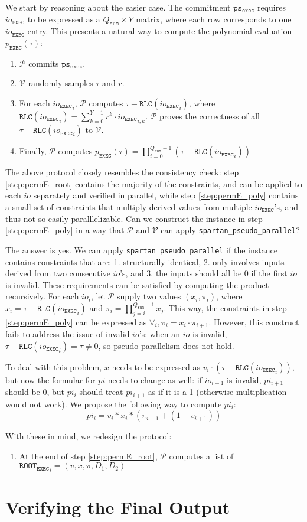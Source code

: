 \documentclass{article}
\newcommand{\code}{\texttt}
\newcommand{\Qsum}{Q_{\mathtt{sum}}}
\renewcommand{\P}{\mathcal{P}}
\newcommand{\V}{\mathcal{V}}
\newcommand{\RLC}{\mathtt{RLC}}
\newcommand{\ioe}{io_{\mathtt{EXEC}}}
\newcommand{\ROOTE}{\mathtt{ROOT_{EXEC}}}
\newcommand{\pse}{\mathtt{ps_{exec}}}
\begin{document}
We start by reasoning about the easier case. The commitment $\pse$ requires $\ioe$ to be expressed as a $\Qsum\times Y$ matrix, where each row corresponds to one $\ioe$ entry. This presents a natural way to compute the polynomial evaluation $p_\mathtt{EXEC}(\tau)$:
\begin{enumerate}
    \item $\P$ commits $\pse$.
    \item $\V$ randomly samples $\tau$ and $r$.
    \item \label{step:permE_root} For each ${\ioe}_i$, $\P$ computes $\tau - \RLC({\ioe}_i)$, where $\RLC({\ioe}_i) = \sum_{k = 0}^{Y-1} r^k \cdot {\ioe}_{i, k}$. $\P$ proves the correctness of all $\tau - \RLC({\ioe}_i)$ to $\V$.
    \item \label{step:permE_poly} Finally, $\P$ computes $p_\mathtt{EXEC}(\tau) = \prod_{i = 0}^{\Qsum - 1}(\tau - \RLC({\ioe}_i))$
\end{enumerate}

The above protocol closely resembles the consistency check: step \ref{step:permE_root} contains the majority of the constraints, and can be applied to each $io$ separately and verified in parallel, while step \ref{step:permE_poly} contains a small set of constraints that multiply derived values from multiple $\ioe$'s, and thus not so easily paralllelizable. Can we construct the instance in step \ref{step:permE_poly} in a way that $\P$ and $\V$ can apply \code{spartan\_pseudo\_parallel}?

The answer is yes. We can apply \code{spartan\_pseudo\_parallel} if the instance contains constraints that are: 1. structurally identical, 2. only involves inputs derived from two consecutive $io$'s, and 3. the inputs should all be 0 if the first $io$ is invalid. These requirements can be satisfied by computing the product recursively. For each $io_i$, let $\P$ supply two values $(x_i, \pi_i)$, where $x_i = \tau - \RLC({\ioe}_i)$ and $\pi_i = \prod_{j = i}^{\Qsum - 1} x_j$. This way, the constraints in step \ref{step:permE_poly} can be expressed as $\forall_i, \pi_i = x_i \cdot \pi_{i+1}$. However, this construct fails to address the issue of invalid $io$'s: when an $io$ is invalid, $\tau - \RLC({\ioe}_i) = \tau\neq 0$, so pseudo-parallelism does not hold.

To deal with this problem, $x$ needs to be expressed as $v_i \cdot (\tau - \RLC({\ioe}_i))$, but now the formular for $pi$ needs to change as well: if $io_{i + 1}$ is invalid, $pi_{i + 1}$ should be 0, but $pi_i$ should treat $pi_{i + 1}$ as if it is a 1 (otherwise multiplication would not work). We propose the following way to compute $pi_i$:
$$pi_i = v_i * x_i * (\pi_{i+1} + (1 - v_{i+1}))$$

With these in mind, we redesign the protocol:
\begin{enumerate}
    \item At the end of step \ref{step:permE_root}, $\P$ computes a list of $\ROOTE_i = (v, x, \pi, D_1, D_2)$
\end{enumerate}


\section{Verifying the Final Output}\label{sec:final_output}
\end{document}
